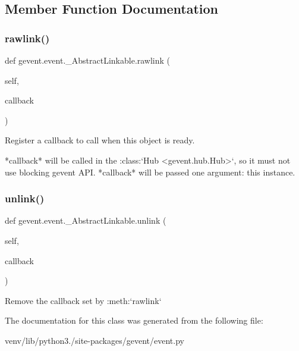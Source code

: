 \subsection{Member Function Documentation}
\mbox{\label{classgevent_1_1event_1_1___abstract_linkable_a30fd21fc344136be3f3229d9778df4f2}} 
\subsubsection{\texorpdfstring{rawlink()}{rawlink()}}
{\footnotesize\ttfamily def gevent.\+event.\+\_\+\+Abstract\+Linkable.\+rawlink (\begin{DoxyParamCaption}\item[{}]{self,  }\item[{}]{callback }\end{DoxyParamCaption})}

\begin{DoxyVerb}Register a callback to call when this object is ready.

*callback* will be called in the :class:`Hub <gevent.hub.Hub>`, so it must not use blocking gevent API.
*callback* will be passed one argument: this instance.
\end{DoxyVerb}
 \mbox{\label{classgevent_1_1event_1_1___abstract_linkable_a8c8ef1a25db923dbb45ba89110268bef}} 
\subsubsection{\texorpdfstring{unlink()}{unlink()}}
{\footnotesize\ttfamily def gevent.\+event.\+\_\+\+Abstract\+Linkable.\+unlink (\begin{DoxyParamCaption}\item[{}]{self,  }\item[{}]{callback }\end{DoxyParamCaption})}

\begin{DoxyVerb}Remove the callback set by :meth:`rawlink`\end{DoxyVerb}
 

The documentation for this class was generated from the following file\+:\begin{DoxyCompactItemize}
\item 
venv/lib/python3./site-\/packages/gevent/event.\+py\end{DoxyCompactItemize}
